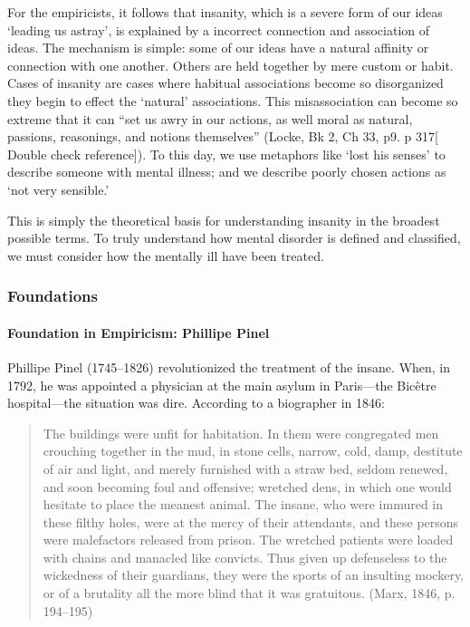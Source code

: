 For the empiricists, it follows that insanity, which is a severe form of our ideas `leading us astray', is explained by a incorrect connection and association of ideas. The mechanism is simple: some of our ideas have a natural affinity or connection with one another. Others are held together by mere custom or habit. Cases of insanity are cases where habitual associations become so disorganized they begin to effect the `natural' associations. This misassociation can become so extreme that it can “set us awry in our actions, as well moral as natural, passions, reasonings, and notions themselves” (Locke, Bk 2, Ch 33, p9. p 317[ Double check reference]). To this day, we use metaphors like `lost his senses' to describe someone with mental illness; and we describe poorly chosen actions as `not very sensible.'

This is simply the theoretical basis for understanding insanity in the broadest possible terms. To truly understand how mental disorder is defined and classified, we must consider how the mentally ill have been treated.

\subsubsection{Foundations}
\label{foundations}

\paragraph{Foundation in Empiricism: Phillipe Pinel}
\label{foundationinempiricism:phillipepinel}

Phillipe Pinel (1745--1826) revolutionized the treatment of the insane. When, in 1792, he was appointed a physician at the main asylum in Paris---the Bicêtre hospital---the situation was dire. According to a biographer in 1846:

\begin{quote}

The buildings were unfit for habitation. In them were congregated men crouching together in the mud, in stone cells, narrow, cold, damp, destitute of air and light, and merely furnished with a straw bed, seldom renewed, and soon becoming foul and offensive; wretched dens, in which one would hesitate to place the meanest animal. The insane, who were immured in these filthy holes, were at the mercy of their attendants, and these persons were malefactors released from prison. The wretched patients were loaded with chains and manacled like convicts. Thus given up defenseless to the wickedness of their guardians, they were the sports of an insulting mockery, or of a brutality all the more blind that it was gratuitous. (Marx, 1846, p. 194--195)
\end{quote}

